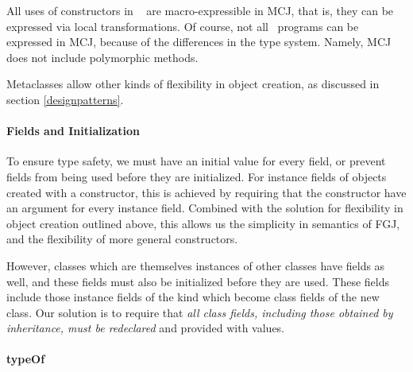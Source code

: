 \documentclass{acm-sigplan}
\begin{document}
All uses of constructors in \FGJ\ \cite{FJ} are macro-expressible
\cite{FellExpress} in MCJ, that is, they can be expressed via local
transformations.  Of course, not all \FGJ\ programs can be expressed
in MCJ, because of the differences in the type system. Namely, MCJ
does not include polymorphic methods.

Metaclasses allow other kinds of flexibility in object creation, as
discussed in section \ref{designpatterns}.

\paragraph{Fields and Initialization}

To ensure type safety, we must have an initial value for every field,
or prevent fields from being used before they are initialized.  For
instance fields of objects created with a constructor, this is achieved
by requiring that the constructor have an argument for every instance
field.  Combined with the solution for flexibility in object creation
outlined above, this allows us the simplicity in semantics of FGJ, and
the flexibility of more general constructors.  

However, classes which are themselves instances of other classes have
fields as well, and these fields must also be initialized before they
are used.  These fields include those instance fields of the kind
which become class fields of the new class.  Our solution is to
require that \emph{all class fields, including those obtained by
inheritance, must be redeclared} and provided with values.  




\paragraph{typeOf}
\end{document}
